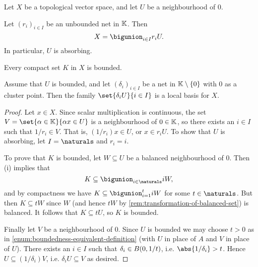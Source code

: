 \documentclass[article, a4paper, 11pt, oneside]{memoir}
\numberwithin{equation}{chapter}
\begin{document}
\begin{proposition}
    Let $X$ be a topological vector space, and let $U$ be a neighbourhood of $0$.
    \begin{enumprop}
        \item \label{enum:0-neighbourhood-absorbing} Let $(r_i)_{i \in I}$ be an unbounded net in $\mathbb{K}$. Then
        \begin{equation*}
            X = \bigunion_{i \in I} r_i U.
        \end{equation*}
        In particular, $U$ is absorbing.

        \item \label{enum:compact-implies-bounded} Every compact set $K$ in $X$ is bounded.

        \item \label{enum:bounded-nhood-local-basis} Assume that $U$ is bounded, and let $(\delta_i)_{i \in I}$ be a net in $\mathbb{K} \setminus \{0\}$ with $0$ as a cluster point. Then the family $\set{\delta_i U}{i \in I}$ is a local basis for $X$.
    \end{enumprop}
\end{proposition}

\begin{proof}
    Let $x \in X$. Since scalar multiplication is continuous, the set $V = \set{\alpha \in \field}{\alpha x \in U}$ is a neighbourhood of $0 \in \mathbb{K}$, so there exists an $i \in I$ such that $1/r_i \in V$. That is, $(1/r_i)x \in U$, or $x \in r_i U$. To show that $U$ is absorbing, let $I = \naturals$ and $r_i = i$.

    To prove that $K$ is bounded, let $W \subseteq U$ be a balanced neighbourhood of $0$. Then (i) implies that
    \begin{equation*}
        K \subseteq \bigunion_{i \in \naturals} i W,
    \end{equation*}
    and by compactness we have $K \subseteq \bigunion_{i=1}^t i W$ for some $t \in \naturals$. But then $K \subseteq tW$ since $W$ (and hence $tW$ by \cref{rem:transformation-of-balanced-set}) is balanced. It follows that $K \subseteq tU$, so $K$ is bounded.

    Finally let $V$ be a neighbourhood of $0$. Since $U$ is bounded we may choose $t > 0$ as in \cref{enum:boundedness-equivalent-definition} (with $U$ in place of $A$ and $V$ in place of $U$). There exists an $i \in I$ such that $\delta_i \in B_{}(0,1/t)$, i.e. $\abs{1/\delta_i} > t$. Hence $U \subseteq (1/\delta_i) V$, i.e. $\delta_i U \subseteq V$ as desired.
\end{proof}
\end{document}
